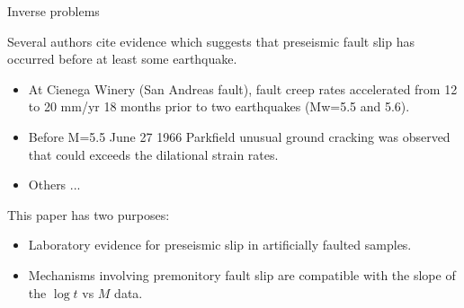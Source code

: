 \documentclass[aspectratio=43,9pt]{beamer}
\begin{document}
\begin{frame}{Inverse problems}

Several authors cite evidence which suggests that preseismic fault slip has occurred before at least some earthquake.\\
\begin{itemize}
 \item At Cienega Winery (San Andreas fault), fault creep rates accelerated from 12 to 20 mm/yr 
       18 months prior to two earthquakes (Mw=5.5 and 5.6).
 \item Before M=5.5 June 27 1966 Parkfield unusual ground cracking was observed that could
       exceeds the dilational strain rates. 
 \item Others ...
\end{itemize}


This paper has two purposes: 
\begin{itemize}
 \item Laboratory evidence for preseismic slip in artificially faulted samples.
 \item Mechanisms involving premonitory fault slip are compatible with the slope of the $\log t$ vs $M$ data.
\end{itemize}


\end{frame}
\end{document}
